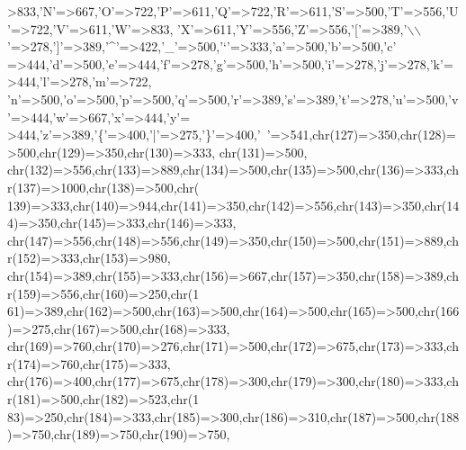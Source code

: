 \begin{DoxyCode}
{      >833,\textcolor{charliteral}{'N'}=>667,\textcolor{charliteral}{'O'}=>722,\textcolor{charliteral}{'P'}=>611,\textcolor{charliteral}{'Q'}=>722,\textcolor{charliteral}{'R'}=>611,\textcolor{charliteral}{'S'}=>500,\textcolor{charliteral}{'T'}=>556,\textcolor{charliteral}{'U'}=>722,\textcolor{charliteral}{'V'}=>611,\textcolor{charliteral}{'W'}=>833,
    \textcolor{charliteral}{'X'}=>611,\textcolor{charliteral}{'Y'}=>556,\textcolor{charliteral}{'Z'}=>556,\textcolor{charliteral}{'['}=>389,\textcolor{charliteral}{'\(\backslash\)\(\backslash\)'}=>278,\textcolor{charliteral}{']'}=>389,\textcolor{charliteral}{'^'}=>422,\textcolor{charliteral}{'\_'}=>500,\textcolor{charliteral}{'`'}=>333,\textcolor{charliteral}{'a'}=>500,\textcolor{charliteral}{'b'}=>500,\textcolor{charliteral}{'c'}
      =>444,\textcolor{charliteral}{'d'}=>500,\textcolor{charliteral}{'e'}=>444,\textcolor{charliteral}{'f'}=>278,\textcolor{charliteral}{'g'}=>500,\textcolor{charliteral}{'h'}=>500,\textcolor{charliteral}{'i'}=>278,\textcolor{charliteral}{'j'}=>278,\textcolor{charliteral}{'k'}=>444,\textcolor{charliteral}{'l'}=>278,\textcolor{charliteral}{'m'}=>722,
    \textcolor{charliteral}{'n'}=>500,\textcolor{charliteral}{'o'}=>500,\textcolor{charliteral}{'p'}=>500,\textcolor{charliteral}{'q'}=>500,\textcolor{charliteral}{'r'}=>389,\textcolor{charliteral}{'s'}=>389,\textcolor{charliteral}{'t'}=>278,\textcolor{charliteral}{'u'}=>500,\textcolor{charliteral}{'v'}=>444,\textcolor{charliteral}{'w'}=>667,\textcolor{charliteral}{'x'}=>444,\textcolor{charliteral}{'y'}=
      >444,\textcolor{charliteral}{'z'}=>389,\textcolor{charliteral}{'\{'}=>400,\textcolor{charliteral}{'|'}=>275,\textcolor{charliteral}{'\}'}=>400,\textcolor{charliteral}{'~'}=>541,chr(127)=>350,chr(128)=>500,chr(129)=>350,chr(130)=>333,
      chr(131)=>500,
    chr(132)=>556,chr(133)=>889,chr(134)=>500,chr(135)=>500,chr(136)=>333,chr(137)=>1000,chr(138)=>500,chr(
      139)=>333,chr(140)=>944,chr(141)=>350,chr(142)=>556,chr(143)=>350,chr(144)=>350,chr(145)=>333,chr(146)=>333,
      chr(147)=>556,chr(148)=>556,chr(149)=>350,chr(150)=>500,chr(151)=>889,chr(152)=>333,chr(153)=>980,
    chr(154)=>389,chr(155)=>333,chr(156)=>667,chr(157)=>350,chr(158)=>389,chr(159)=>556,chr(160)=>250,chr(1
      61)=>389,chr(162)=>500,chr(163)=>500,chr(164)=>500,chr(165)=>500,chr(166)=>275,chr(167)=>500,chr(168)=>333,
      chr(169)=>760,chr(170)=>276,chr(171)=>500,chr(172)=>675,chr(173)=>333,chr(174)=>760,chr(175)=>333,
    chr(176)=>400,chr(177)=>675,chr(178)=>300,chr(179)=>300,chr(180)=>333,chr(181)=>500,chr(182)=>523,chr(1
      83)=>250,chr(184)=>333,chr(185)=>300,chr(186)=>310,chr(187)=>500,chr(188)=>750,chr(189)=>750,chr(190)=>750,
}
\end{DoxyCode}

